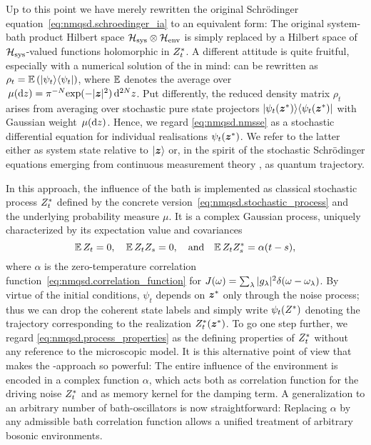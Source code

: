 Up to this point we have merely rewritten the original Schrödinger equation~\ref{eq:nmqsd.schroedinger_ia} to an equivalent form:
The original system-bath product Hilbert space $\mathcal{H}_\mathrm{sys} \otimes \mathcal{H}_\mathrm{env}$ is simply replaced by a Hilbert space of $\mathcal{H}_\mathrm{sys}$-valued functions holomorphic in ${Z}^*_t$.
A different attitude is quite fruitful, especially with a numerical solution of the \NMSSE in mind:
 can be rewritten as $\rho_t = \E[\ket{\psi_t}\bra{\psi_t}]$, where $\E$ denotes the average over $\mudz = \pi^{-N} \exp(-\abs{\vec z}^2) \dd^{2N}z$.
Put differently, the reduced density matrix $\rho_t$ arises from averaging over stochastic pure state projectors $\ket{\psitz}\bra{\psitz}$ with Gaussian weight $\, \mu(\mathrm{d} z)$.
Hence, we regard \autoref{eq:nmqsd.nmsse} as a stochastic differential equation for individual realisations $\psi_t({\boldsymbol{z}}^*)$.
We refer to the latter either as system state relative to $| \boldsymbol{z} \rangle$ or, in the spirit of the stochastic Schrödinger equations emerging from continuous measurement theory \cite{Ca93_quantum_optics}, as quantum trajectory.

In this approach, the influence of the bath is implemented as classical stochastic process ${Z}^*_t$ defined by the concrete version~\ref{eq:nmqsd.stochastic_process} and the underlying probability measure $\mu$.
It is a complex Gaussian process, uniquely characterized by its expectation value and covariances
\begin{equation}
  \E\,Z_t = 0, \quad \E\,Z_t Z_s =0, \quad\mbox{and}\quad \E\,Z_t \ZZ_s = \alpha(t-s),
  \label{eq:nmqsd.process_properties}
\end{equation}
where $\alpha$ is the zero-temperature correlation function~\ref{eq:nmqsd.correlation_function} for $J(\omega) = \sum_\lambda \vert g_\lambda \vert^2 \delta(\omega - \omega_\lambda)$.
By virtue of the initial conditions, $\psi_t$ depends on ${\boldsymbol{z}}^*$ only through the noise process; thus we can drop the coherent state labels and simply write $\psitZ$ denoting the trajectory corresponding to the realization ${Z}^*_t({\boldsymbol{z}}^*)$.
To go one step further, we regard \autoref{eq:nmqsd.process_properties} as the defining properties of ${Z}^*_t$ without any reference to the microscopic model.
It is this alternative point of view that makes the \NMSSE-approach so powerful:
The entire influence of the environment is encoded in a complex function $\alpha$, which acts both as correlation function for the driving noise ${Z}^*_t$ and as memory kernel for the damping term.
A generalization to an arbitrary number of bath-oscillators is now straightforward: Replacing $\alpha$ by any admissible bath correlation function allows a unified treatment of arbitrary bosonic environments.

